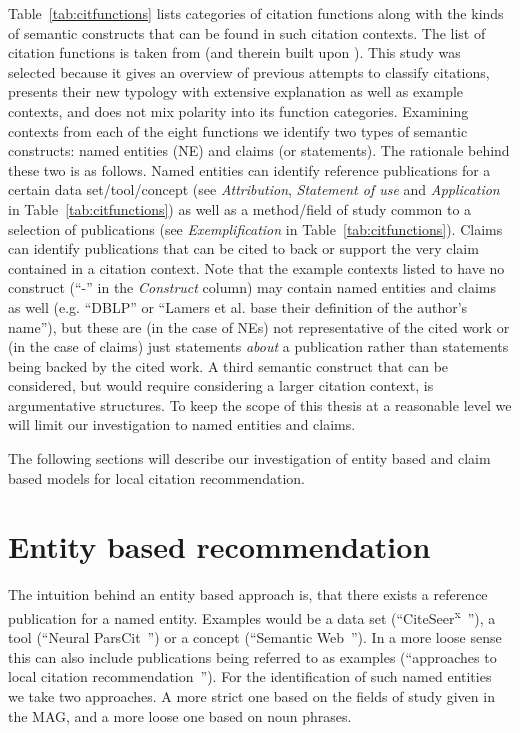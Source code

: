 Table~\ref{tab:citfunctions} lists categories of citation functions along with the kinds of semantic constructs that can be found in such citation contexts. The list of citation functions is taken from \cite{Petric2007} (and therein built upon \cite{Thompson2001}). This study was selected because it gives an overview of previous attempts to classify citations, presents their new typology with extensive explanation as well as example contexts, and does not mix polarity into its function categories. Examining contexts from each of the eight functions we identify two types of semantic constructs: named entities (NE) and claims (or statements). The rationale behind these two is as follows. Named entities can identify reference publications for a certain data set/tool/concept (see \emph{Attribution}, \emph{Statement of use} and \emph{Application} in Table~\ref{tab:citfunctions}) as well as a method/field of study common to a selection of publications (see \emph{Exemplification} in Table~\ref{tab:citfunctions}). Claims can identify publications that can be cited to back or support the very claim contained in a citation context. Note that the example contexts listed to have no construct (``-'' in the \emph{Construct} column) may contain named entities and claims as well (e.g. ``DBLP'' or ``Lamers et al. base their definition of the author's name''), but these are (in the case of NEs) not representative of the cited work or (in the case of claims) just statements \emph{about} a publication rather than statements being backed by the cited work.
A third semantic construct that can be considered, but would require considering a larger citation context, is argumentative structures. To keep the scope of this thesis at a reasonable level we will limit our investigation to named entities and claims.

The following sections will describe our investigation of entity based and claim based models for local citation recommendation.

\section{Entity based recommendation}
The intuition behind an entity based approach is, that there exists a reference publication for a named entity. Examples would be a data set (``CiteSeer\textsuperscript{x}~\cite{Caragea2014}''), a tool (``Neural ParsCit~\cite{Animesh2018}'') or a concept (``Semantic Web~\cite{Berners-Lee2001}''). In a more loose sense this can also include publications being referred to as examples (``approaches to local citation recommendation~\cite{He2010,Huang2014,Huang2015,Duma2014,Duma2016,Ebesu2017,Kobayashi2018,Jeong2019}'').
For the identification of such named entities we take two approaches. A more strict one based on the fields of study given in the MAG, and a more loose one based on noun phrases.


